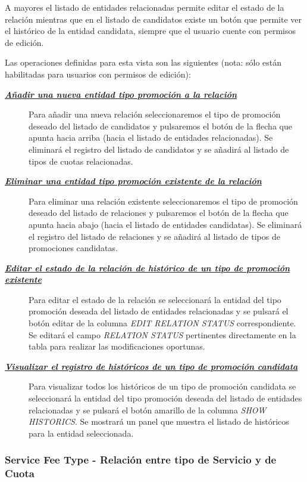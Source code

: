 A mayores el listado de entidades relacionadas permite editar el estado de la relación mientras que en el listado de candidatos existe un botón que permite ver el histórico de la entidad candidata, siempre que el usuario cuente con permisos de edición.


Las operaciones definidas para esta vista son las siguientes (nota: sólo están habilitadas para usuarios con permisos de edición):
\begin{description}
\item[\underline{\textsl{\textbf{Añadir una nueva entidad tipo promoción a la relación}}}] Para añadir una nueva relación seleccionaremos el tipo de promoción deseado del listado de candidatos y pulsaremos el botón de la flecha que apunta hacia arriba (hacia el listado de entidades relacionadas). Se eliminará el registro del listado de candidatos y se añadirá al listado de tipos de cuotas relacionadas.

\item[\underline{\textsl{\textbf{Eliminar una entidad tipo promoción existente de la relación}}}] Para eliminar una relación existente seleccionaremos el tipo de promoción deseado del listado de relaciones y pulsaremos el botón de la flecha que apunta hacia abajo (hacia el listado de entidades candidatas). Se eliminará el registro del listado de relaciones y se añadirá al listado de tipos de promociones candidatas.

\item[\underline{\textsl{\textbf{Editar el estado de la relación de histórico de un tipo de promoción existente}}}] Para editar el estado de la relación se seleccionará la entidad del tipo promoción  deseada del listado de entidades relacionadas y se pulsará el botón editar de la columna \textit{EDIT RELATION STATUS} correspondiente. Se editará el campo \emph{RELATION STATUS}  pertinentes directamente en la tabla para realizar las modificaciones oportunas.

\item[\underline{\textsl{\textbf{Visualizar el registro de históricos de un tipo de promoción candidata}}}] Para visualizar todos los históricos de un tipo de promoción candidata se seleccionará la entidad del tipo promoción deseada del listado de entidades relacionadas y se pulsará el botón amarillo de la columna \textit{SHOW HISTORICS}. Se mostrará un panel que muestra el listado de históricos para la entidad seleccionada. 
\end{description}


\subsubsection{Service Fee Type - Relación entre tipo de Servicio y de Cuota}
\label{sub:service-fee-type-relation}

